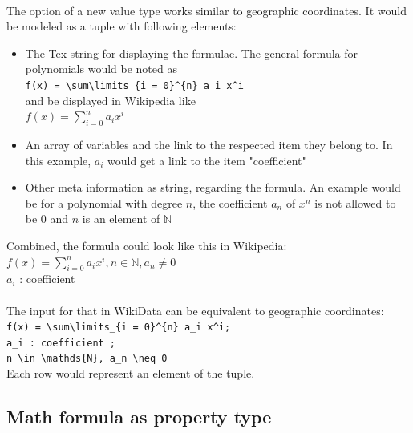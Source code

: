 \documentclass[12pt]{article}
\begin{document}
\paragraph{}
The option of a new value type works similar to geographic coordinates. It would be modeled as a tuple with following elements:
\begin{itemize}
\item The Tex string for displaying the formulae. The general formula for polynomials would be noted as\\ \verb|f(x) = \sum\limits_{i = 0}^{n} a_i x^i|\\
and be displayed in Wikipedia like\\
$f(x) = \sum\limits_{i = 0}^{n} a_i x^i$
\item An array of variables and the link to the respected item they belong to. In this example, $a_i$ would get a link to the item "coefficient"
\item Other meta information as string, regarding the formula. An example would be for a polynomial with degree $n$, the coefficient $a_n$ of $x^n$ is not allowed to be $0$ and $n$ is an element of $\mathds{N}$
\end{itemize}
Combined, the formula could look like this in Wikipedia:\\
$f(x) = \sum\limits_{i = 0}^{n} a_i x^i, n \in \mathds{N}, a_n \neq 0$\\
$a_i$ : coefficient\\
\\
The input for that in WikiData can be equivalent to geographic coordinates:\\
\verb!f(x) = \sum\limits_{i = 0}^{n} a_i x^i;!\\
\verb!a_i : coefficient ;!\\
\verb!n \in \mathds{N}, a_n \neq 0!\\
Each row would represent an element of the tuple.

\subsection{Math formula as property type}
\end{document}
